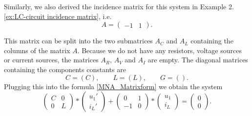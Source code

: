 \begin{example2}[LC-Circuit]
	\label{ex:LC-circuit MNA}
	Similarly, we also derived the incidence matrix for this system in Example 2.\ref{ex:LC-circuit incidence matrix}, i.e.
	\begin{displaymath}
		A = 
		\left(
		\begin{matrix}
			-1 & 1  
		\end{matrix}
		\right).
	\end{displaymath}
	
	This matrix can be split into the two submatrices $A_C$ and $A_L$ containing the columns of the matrix $A$. Because we do not have any resistors, voltage sources or current sources, the matrices $A_R$, $A_V$ and $A_I$ are empty. The diagonal matrices containing the components constants are
	\begin{displaymath}
		C = (C), \qquad L = (L), \qquad G=().
	\end{displaymath}
	Plugging this into the formula \eqref{MNA_Matrixform} we obtain the system
	\begin{displaymath}
		\begin{pmatrix}
			C & 0 \\
			0 & L 
		\end{pmatrix}
		*
		\begin{pmatrix}
			u_1' \\
			i_L'
		\end{pmatrix}
		+
		\begin{pmatrix}
			0 & 1 \\
			-1 & 0
		\end{pmatrix}
		*
		\begin{pmatrix}
			u_1 \\
			i_L
		\end{pmatrix}
		=
		\begin{pmatrix}
			0 \\
			0 
		\end{pmatrix}.
	\end{displaymath}
\end{example2}


